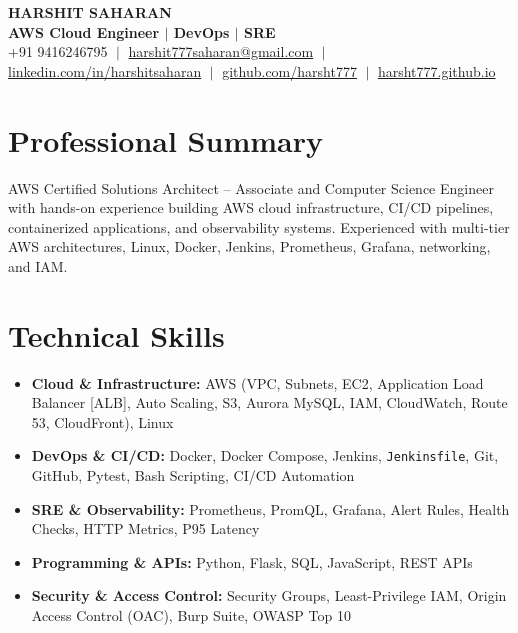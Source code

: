 \documentclass[letterpaper,9.8pt]{article}
\newcommand{\resumeSkillListStart}{\begin{itemize}[leftmargin=0.18in, labelsep=0.06in, itemsep=1.2pt, topsep=0.5pt, parsep=0pt, partopsep=0pt]}
\newcommand{\resumeSkillListEnd}{\end{itemize}\vspace{1.5pt}}
\begin{document}
\begin{center}
    {\Huge \textbf{HARSHIT SAHARAN}} \\ \vspace{2pt}
    {\large \textbf{\color{primary}AWS Cloud Engineer $\vert$ DevOps $\vert$ SRE}} \\ \vspace{3.5pt}
    \small 
    +91 9416246795 $\;\vert\;$ 
    \href{mailto:harshit777saharan@gmail.com}{harshit777saharan@gmail.com} $\;\vert\;$ 
    \href{https://linkedin.com/in/harshitsaharan}{linkedin.com/in/harshitsaharan} $\;\vert\;$ 
    \href{https://github.com/harsht777}{github.com/harsht777} $\;\vert\;$ 
    \href{https://harsht777.github.io/}{harsht777.github.io}
\end{center}
\vspace{-10pt}

\section{Professional Summary}
\vspace{1pt}
\small{
AWS Certified Solutions Architect -- Associate and Computer Science Engineer with hands-on experience building AWS cloud infrastructure, CI/CD pipelines, containerized applications, and observability systems. Experienced with multi-tier AWS architectures, Linux, Docker, Jenkins, Prometheus, Grafana, networking, and IAM.
}
\vspace{2pt}

\section{Technical Skills}
\resumeSkillListStart
  \item \small{\textbf{Cloud \& Infrastructure:} AWS (VPC, Subnets, EC2, Application Load Balancer [ALB], Auto Scaling, S3, Aurora MySQL, IAM, CloudWatch, Route 53, CloudFront), Linux}
  \item \small{\textbf{DevOps \& CI/CD:} Docker, Docker Compose, Jenkins, \texttt{Jenkinsfile}, Git, GitHub, Pytest, Bash Scripting, CI/CD Automation}
  \item \small{\textbf{SRE \& Observability:} Prometheus, PromQL, Grafana, Alert Rules, Health Checks, HTTP Metrics, P95 Latency}
  \item \small{\textbf{Programming \& APIs:} Python, Flask, SQL, JavaScript, REST APIs}
  \item \small{\textbf{Security \& Access Control:} Security Groups, Least-Privilege IAM, Origin Access Control (OAC), Burp Suite, OWASP Top 10}
\resumeSkillListEnd
\end{document}
